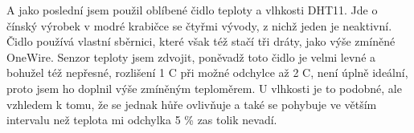 A jako poslední jsem použil oblíbené čidlo teploty a vlhkosti DHT11. Jde o čínský výrobek v modré krabičce se čtyřmi 
vývody, z nichž jeden je neaktivní. Čidlo používá vlastní sběrnici, které však též stačí tři dráty, jako výše zmíněné 
OneWire. Senzor teploty jsem zdvojit, poněvadž toto čidlo je velmi levné a bohužel též nepřesné, rozlišení 1 \textdegree C při 
možné odchylce až 2 \textdegree C, není úplně ideální, proto jsem ho doplnil výše zmíněným teploměrem. U vlhkosti je to podobné, 
ale vzhledem k tomu, že se jednak hůře ovlivňuje a také se pohybuje ve větším intervalu než teplota mi odchylka 5 \% zas 
tolik nevadí.
